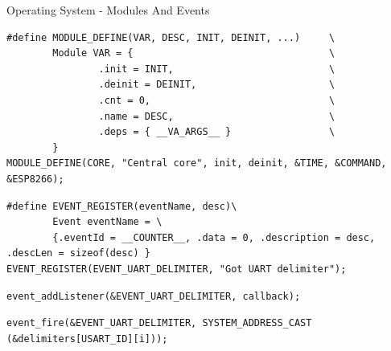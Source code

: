 \documentclass[apectratio=169]{beamer}
\begin{document}
\begin{frame}[fragile]{Operating System - Modules And Events}
\begin{verbatim}
#define MODULE_DEFINE(VAR, DESC, INIT, DEINIT, ...)     \
        Module VAR = {                                  \
                .init = INIT,                           \
                .deinit = DEINIT,                       \
                .cnt = 0,                               \
                .name = DESC,                           \
                .deps = { __VA_ARGS__ }                 \
        }
MODULE_DEFINE(CORE, "Central core", init, deinit, &TIME, &COMMAND, &ESP8266);
\end{verbatim}

\begin{verbatim}
#define EVENT_REGISTER(eventName, desc)\
        Event eventName = \
        {.eventId = __COUNTER__, .data = 0, .description = desc, .descLen = sizeof(desc) }
EVENT_REGISTER(EVENT_UART_DELIMITER, "Got UART delimiter");
\end{verbatim}

\begin{verbatim}
event_addListener(&EVENT_UART_DELIMITER, callback);
\end{verbatim}

\begin{verbatim}
event_fire(&EVENT_UART_DELIMITER, SYSTEM_ADDRESS_CAST (&delimiters[USART_ID][i]));
\end{verbatim}


\end{frame}	
\end{document}
